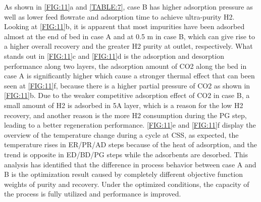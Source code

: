 \documentclass[preprint,12pt]{elsarticle}
\begin{document}
As shown in \cref{FIG:11}a and \cref{TABLE:7}, case B has higher adsorption pressure as well as lower feed flowrate and adsorption time to achieve ultra-purity H2. Looking at \cref{FIG:11}b, it is apparent that most impurities have been adsorbed almost at the end of bed in case A and at 0.5 m in case B, which can give rise to a higher overall recovery and the greater H2 purity at outlet, respectively. What stands out in \cref{FIG:11}c and \cref{FIG:11}d is the adsorption and desorption performance along two layers, the adsorption amount of CO2 along the bed in case A is significantly higher which cause a stronger thermal effect that can been seen at \cref{FIG:11}f, because there is a higher partial pressure of CO2 as shown in \cref{FIG:11}b. Due to the weaker competitive adsorption effect of CO2 in case B, a small amount of H2 is adsorbed in 5A layer, which is a reason for the low H2 recovery, and another reason is the more H2 consumption during the PG step, leading to a better regeneration performance. \cref{FIG:11}e and \cref{FIG:11}f display the overview of the temperature change during a cycle at CSS, as expected, the temperature rises in ER/PR/AD steps because of the heat of adsorption, and the trend is opposite in ED/BD/PG steps while the adsorbents are desorbed. This analysis has identified that the difference in process behavior between case A and B is the optimization result caused by completely different objective function weights of purity and recovery. Under the optimized conditions, the capacity of the process is fully utilized and performance is improved.
\end{document}

